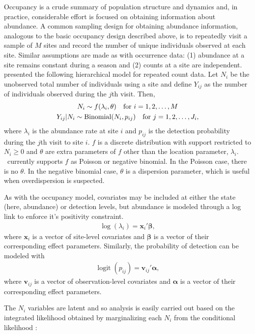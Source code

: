 \documentclass[article,shortnames]{jss}
\DeclareMathOperator{\logit}{logit}
\DeclareMathOperator{\Bin}{Binomial}
\newcommand{\um}{\pkg{unmarked}}
\begin{document}
Occupancy is a crude summary of population structure and dynamics and, in 
practice, considerable effort is focused on obtaining information about 
abundance. A common sampling design for obtaining abundance information, 
analogous to the basic occupancy design described above, is to 
repeatedly visit a sample of $M$ sites and
record the number of unique individuals observed at each site.
Similar assumptions are made as with occurrence data: (1) abundance at
a site remains constant during a season and (2) counts at a site are
independent.  \citet{Royle2004} presented the following hierarchical model for
repeated count data.  Let $N_i$ be the unobserved total number of
individuals using a site and define $Y_{ij}$ as the number of individuals 
observed during the $j$th visit.  Then,
\begin{gather}
  N_i \sim f(\lambda_i, \theta) \text{\quad for $i=1,2,\dots,M$} \label{eq:pc2} \\
  Y_{ij}|N_{i} \sim \Bin(N_i, p_{ij})\text{\quad for $j=1,2,\dots,J_{i}$},
\end{gather}
where $\lambda_i$ is the abundance rate at site $i$ and $p_{ij}$ is
the detection probability during the $j$th visit to site $i$.  $f$ is
a discrete distribution with support restricted to $N_{i} \ge 0$ and
$\theta$ are extra parameters of $f$ other than the location
parameter, $\lambda_{i}$.  \um\ currently supports $f$ as Poisson or
negative binomial.  In the Poisson case, there is no $\theta$.  In the
negative binomial case, $\theta$ is a dispersion parameter, which is
useful when overdispersion is suspected.

As with the occupancy model, covariates may be included at either the
state (here, abundance) or detection levels, but abundance is modeled
through a log link to enforce it's positivity constraint.
\begin{gather}
  \log(\lambda_i) = \mathbf x_i' \mathbf \beta,
\end{gather}
where $\mathbf x_i$ is a vector of site-level covariates and $\mathbf \beta$
is a vector of their corresponding effect parameters.  Similarly, the
probability of detection can be modeled with
\begin{gather}
  \logit(p_{ij}) = \mathbf v_{ij}' \mathbf \alpha,
\end{gather}
where $\mathbf v_{ij}$ is a vector of observation-level covariates and
$\mathbf \alpha$ is a vector of their corresponding effect parameters.

The $N_{i}$ variables are latent and so analysis is easily carried out based on 
the integrated likelihood obtained by marginalizing each $N_{i}$ from the 
conditional likelihood \citet{Royle2004b}:
\end{document}

